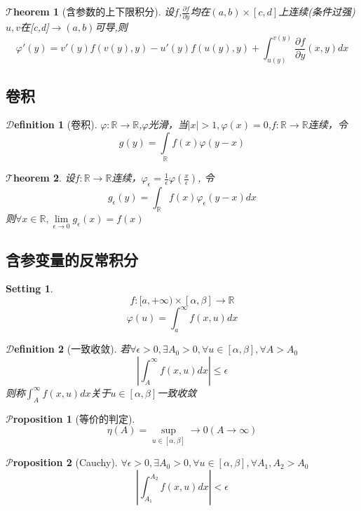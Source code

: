 \documentclass[hyperfer,UTF8,a4paper,12pt]{article}
\theoremstyle{plain}
\newtheorem{Thm}{$\mathcal{T}$heorem}
\newtheorem*{Prop}{$\mathcal{P}$roposition}
\newtheorem{Def}{{$\mathcal{D}$efinition}}[section]
\newtheorem*{Setting}{{Setting}}
\begin{document}
\begin{Thm}[含参数的上下限积分]
		设$ f $,$ \frac{\partial f}{\partial y} $均在$ (a,b)\times[c,d] $上连续(条件过强)
		$ u,v $在[c,d]$\to(a,b)$可导,则
	\[ \varphi'(y)=v'(y)f(v(y),y)-u'(y)f(u(y),y)+\int_{u(y
		)}^{v(y)}\frac{\partial f}{\partial y}(x,y)dx   \]
\end{Thm}

\subsection{卷积}
\begin{Def}[卷积]
	$ \varphi:\mathbb{R}\to\mathbb{R} $,$ \varphi $光滑，当$ |x|>1 ,\varphi(x)=0$,$ f:\mathbb{R}\to\mathbb{R} $连续，令\[ g(y)=\int\limits_\mathbb{R} f(x)\varphi(y-x)   \]
\end{Def}



\begin{Thm}
	设$ f:\mathbb{R}\to\mathbb{R} $连续，$ \varphi_\epsilon=\frac{1}{\epsilon}\varphi(\frac{x}{\epsilon}) $,
	令\[ g_\epsilon(y)=\int_{\mathbb{R}}f(x)\varphi_\epsilon(y-x) dx   \]
	则$ \forall x\in \mathbb{R} ,\lim\limits_{\epsilon\to0}g_\epsilon(x)=f(x)    $
\end{Thm}


\subsection{含参变量的反常积分}

\begin{Setting}
	\[ f:[a,+\infty)\times[\alpha,\beta]\to\mathbb{R} \]
	\[ \varphi(u)=\int_{a}^{\infty}f(x,u)dx  \]
\end{Setting}

\begin{Def}[一致收敛]
	若$ \forall\epsilon>0,\exists A_0>0,\forall u\in[\alpha,\beta] ,\forall A>A_0$
	\[  |\int_{A}^{\infty}f(x,u)dx |\leqslant\epsilon  \]
	则称$ \int_{A}^{\infty}f(x,u)dx $关于$ u\in[\alpha,\beta] $一致收敛
\end{Def}

\begin{Prop}[等价的判定]
	\[ \eta(A)=\sup\limits_{u\in[\alpha,\beta]}\to 0 (A\to \infty)  \]
\end{Prop}

\begin{Prop}[Cauchy]
	$ \forall\epsilon>0,\exists A_0>0,\forall u\in[\alpha,\beta],\forall A_1,A_2>A_0 $
	\[  |\int_{A_1}^{A_2}f(x,u)dx |<\epsilon  \]
\end{Prop}
\end{document}
